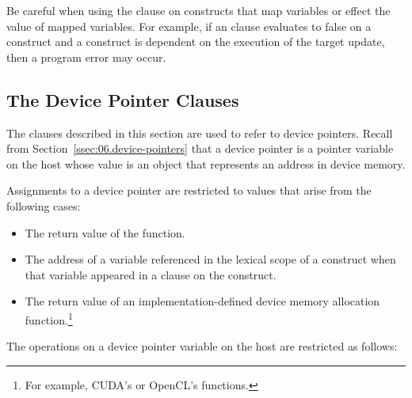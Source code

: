 Be careful when using the  clause on constructs that
map variables or effect the value of mapped variables.  
For example, if an  clause evaluates to false on a
 construct and a  construct is dependent on
the execution of the target update, then a program error may occur.

\subsection{The Device Pointer Clauses}
\label{sec:06.Device-pointer-clauses}

The clauses described in this section are used to refer to device pointers.
Recall from Section~\ref{ssec:06.device-pointers} that a device pointer is a
pointer variable on the host whose value is an object that represents an
address in device memory.

Assignments to a device pointer are restricted to values that arise
from the following cases:

\begin{itemize}

  \item The return value of the  function.

  \item The address of a variable referenced in the lexical scope of a
   construct when that variable appeared in a
   clause on the construct.

  \item The return value of an implementation-defined device memory allocation
  function.\footnote{For example, CUDA's \cite{CUDA-website} or OpenCL's
  \cite{OpenCL-website} functions.}


\end{itemize}

The operations on a device pointer variable on the host are restricted as
follows:

